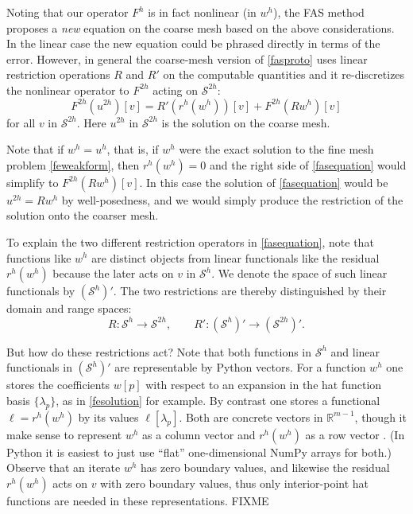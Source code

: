 \documentclass[letterpaper,final,12pt,reqno]{amsart}
\newcommand{\RR}{\mathbb{R}}
\begin{document}
Noting that our operator $F^h$ is in fact nonlinear (in $w^h$), the FAS method  proposes a \emph{new} equation on the coarse mesh based on the above considerations.  In the linear case the new equation could be phrased directly in terms of the error.  However, in general the coarse-mesh version of \eqref{fasproto} uses linear restriction operations $R$ and $R'$ on the computable quantities and it re-discretizes the nonlinear operator to $F^{2h}$ acting on $\mathcal{S}^{2h}$:
\begin{equation}
  F^{2h}(u^{2h})[v] = R' (r^h(w^h))[v] + F^{2h}(R w^h)[v] \label{fasequation}
\end{equation}
for all $v$ in $\mathcal{S}^{2h}$.  Here $u^{2h}$ in $\mathcal{S}^{2h}$ is the solution on the coarse mesh.

Note that if $w^h=u^h$, that is, if $w^h$ were the exact solution to the fine mesh problem \eqref{feweakform}, then $r^h(w^h)=0$ and the right side of \eqref{fasequation} would simplify to $F^{2h}(R w^h)[v]$.  In this case the solution of \eqref{fasequation} would be $u^{2h} = R w^h$ by well-posedness, and we would simply produce the restriction of the solution onto the coarser mesh.

To explain the two different restriction operators in \eqref{fasequation}, note that functions like $w^h$ are distinct objects from linear functionals like the residual $r^h(w^h)$ because the later acts on $v$ in $\mathcal{S}^h$.  We denote the space of such linear functionals by $(\mathcal{S}^h)'$.  The two restrictions are thereby distinguished by their domain and range spaces:
\begin{equation}
  R : \mathcal{S}^h \to \mathcal{S}^{2h}, \qquad  R' : (\mathcal{S}^h)' \to (\mathcal{S}^{2h})'. \label{restrictions}
\end{equation}

But how do these restrictions act?  Note that both functions in $\mathcal{S}^h$ and linear functionals in $(\mathcal{S}^h)'$ are representable by Python vectors.  For a function $w^h$ one stores the coefficients $w[p]$ with respect to an expansion in the hat function basis $\{\lambda_p\}$, as in \eqref{fesolution} for example.  By contrast one stores a functional $\ell=r^h(w^h)$ by its values $\ell[\lambda_p]$.  Both are concrete vectors in $\RR^{m-1}$, though it make sense to represent $w^h$ as a column vector and $r^h(w^h)$ as a row vector \cite{TrefethenBau1997}.  (In Python it is easiest to just use ``flat'' one-dimensional NumPy arrays for both.)   Observe that an iterate $w^h$ has zero boundary values, and likewise the residual $r^h(w^h)$ acts on $v$ with zero boundary values, thus only interior-point hat functions are needed in these representations.  FIXME
\end{document}
